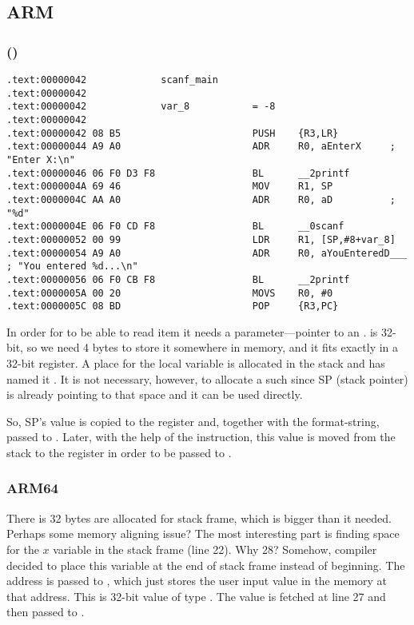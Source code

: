 \subsection{ARM}

\subsubsection{\OptimizingKeilVI (\ThumbMode)}

\begin{lstlisting}
.text:00000042             scanf_main
.text:00000042
.text:00000042             var_8           = -8
.text:00000042
.text:00000042 08 B5                       PUSH    {R3,LR}
.text:00000044 A9 A0                       ADR     R0, aEnterX     ; "Enter X:\n"
.text:00000046 06 F0 D3 F8                 BL      __2printf
.text:0000004A 69 46                       MOV     R1, SP
.text:0000004C AA A0                       ADR     R0, aD          ; "%d"
.text:0000004E 06 F0 CD F8                 BL      __0scanf
.text:00000052 00 99                       LDR     R1, [SP,#8+var_8]
.text:00000054 A9 A0                       ADR     R0, aYouEnteredD___ ; "You entered %d...\n"
.text:00000056 06 F0 CB F8                 BL      __2printf
.text:0000005A 00 20                       MOVS    R0, #0
.text:0000005C 08 BD                       POP     {R3,PC}
\end{lstlisting}

\myindex{\CLanguageElements!\Pointers}

In order for \scanf to be able to read item it needs a parameter---pointer to an \Tint.
\Tint is 32-bit, so we need 4 bytes to store it somewhere in memory, and it fits exactly in a 32-bit register.
A place for the local variable  is allocated in the stack and \IDA
has named it . It is not necessary, however, to allocate a such since \ac{SP} (\gls{stack pointer}) is already pointing to that space and it can be used directly.

So, \ac{SP}'s value is copied to the  register and, together with the format-string, passed to \scanf.
Later, with the help of the  instruction, this value is moved from the stack to the  register in order to be passed to \printf.

\subsubsection{ARM64}



There is 32 bytes are allocated for stack frame, which is bigger than it needed. Perhaps some memory aligning issue?
The most interesting part is finding space for the $x$ variable in the stack frame (line 22).
Why 28? Somehow, compiler decided to place this variable at the end of stack frame instead of beginning.
The address is passed to \scanf, which just stores the user input value in the memory at that address.
This is 32-bit value of type \Tint.
The value is fetched at line 27 and then passed to \printf.

